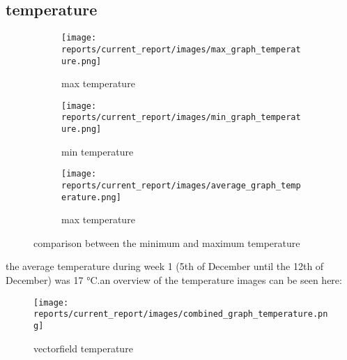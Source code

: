 \subsection{temperature} 
\begin{figure}[hbt!] 
\begin{subfigure}{0.3\textwidth} 
\texttt{[image: reports/current\_report/images/max\_graph\_temperature.png]}  
\caption{max temperature}  
\end{subfigure} 
\begin{subfigure}{0.3\textwidth} 
\texttt{[image: reports/current\_report/images/min\_graph\_temperature.png]}  
\caption{min temperature}  
\end{subfigure} 
\begin{subfigure}{0.3\textwidth} 
\texttt{[image: reports/current\_report/images/average\_graph\_temperature.png]}  
\caption{max temperature}  
\end{subfigure} 
\caption{comparison between the minimum and maximum temperature}  
\end{figure} 
\FloatBarrier  
the average temperature during week 1 (5th of December until the 12th of December) was 17 °C.an overview of the temperature images can be seen here:\begin{SCfigure}[0.5][hbt!]
\texttt{[image: reports/current\_report/images/combined\_graph\_temperature.png]}  
\caption{vectorfield temperature}  
\end{SCfigure} 
\FloatBarrier  
